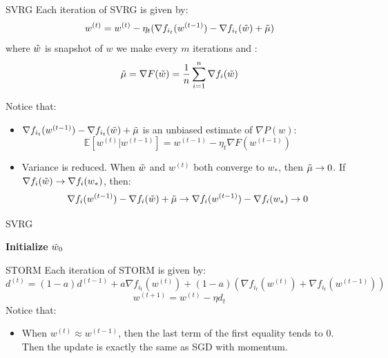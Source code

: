 \documentclass[10pt]{beamer}
\begin{document}
\begin{frame}{SVRG}
    Each iteration of SVRG is given by:
    $$w^{(t)} = w^{(t)} -\eta_t(\nabla f_{i_t}(w^{(t-1)}) - \nabla f_{i_t}(\Tilde{w}) + \Tilde{\mu})$$
    where $\Tilde{w}$ is snapshot of $w$ we make every $m$ iterations and :
    $$\Tilde{\mu} = \nabla F(\Tilde{w}) = \frac{1}{n}\sum_{i=1}^n \nabla f_i(\Tilde{w})$$
    
    Notice that: 
    \begin{itemize}
        \item $\nabla f_{i_t}(w^{(t-1)}) - \nabla f_{i_t}(\Tilde{w}) + \Tilde{\mu}$ is an unbiased estimate of $\nabla P(w)$:
    $$\mathbb{E}[w^{(t)} | w^{(t-1)}] = w^{(t-1)}-\eta_t \nabla F(w^{(t-1)})$$
        \item Variance is reduced. When $\Tilde{w}$ and $w^{(t)}$ both converge to $w_{\ast}$, then $\Tilde{\mu} \rightarrow 0$. If $\nabla f_i(\Tilde{w}) \rightarrow \nabla f_i(w_{\ast})$, then:
        $$\nabla f_i(w^{(t-1)}) - \nabla f_i(\Tilde{w}) + \Tilde{\mu} \rightarrow \nabla f_i(w^{(t-1)}) - \nabla f_i(w_{\ast}) \rightarrow 0$$
    \end{itemize}
\end{frame}


\begin{frame}{SVRG}
    \begin{algorithm}[H]
        \DontPrintSemicolon
        \SetAlgoNoLine

        \textbf{Initialize} $\Tilde{w}_0$\;
        \caption{{\textsc{SVRG Procedure}}}
        \label{algo:svrg}
    \end{algorithm}
\end{frame}

\begin{frame}{STORM}
    Each iteration of STORM is given by:
    $$d^{(t)} = (1-a)d^{(t-1)} + a\nabla f_{i_t}(w^{(t)}) + (1-a)(\nabla f_{i_t}(w^{(t)}) +  \nabla f_{i_t}(w^{(t-1)}))$$
    $$w^{(t+1)} = w^{(t)} - \eta d_t$$
    Notice that:
    \begin{itemize}
        \item When $w^{(t)} \approx w^{(t-1)}$, then the last term of the first equality tends to 0. Then the update is exactly the same as SGD with momentum. 
    \end{itemize}
\end{frame}
\end{document}
